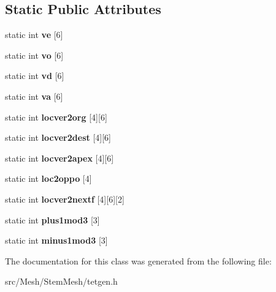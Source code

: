 \subsection*{Static Public Attributes}
\begin{DoxyCompactItemize}
\item 
\mbox{\label{classStemMesh3D_1_1tetgenmesh_a418aa92bf7126962188836f0ba8831f0}} 
static int {\bfseries ve} \mbox{[}6\mbox{]}
\item 
\mbox{\label{classStemMesh3D_1_1tetgenmesh_aaaf6941b2175d20b725c5cc29c256ee2}} 
static int {\bfseries vo} \mbox{[}6\mbox{]}
\item 
\mbox{\label{classStemMesh3D_1_1tetgenmesh_a1dc3584acb1ffdda4ad0a2b1eedfbcb7}} 
static int {\bfseries vd} \mbox{[}6\mbox{]}
\item 
\mbox{\label{classStemMesh3D_1_1tetgenmesh_ac4887ef4540ee117e9c0daee542e9928}} 
static int {\bfseries va} \mbox{[}6\mbox{]}
\item 
\mbox{\label{classStemMesh3D_1_1tetgenmesh_ad993ff3250c17fc730ec35fcfdd1c968}} 
static int {\bfseries locver2org} \mbox{[}4\mbox{]}\mbox{[}6\mbox{]}
\item 
\mbox{\label{classStemMesh3D_1_1tetgenmesh_a3a960be38f4658125ab0e04b79f13b51}} 
static int {\bfseries locver2dest} \mbox{[}4\mbox{]}\mbox{[}6\mbox{]}
\item 
\mbox{\label{classStemMesh3D_1_1tetgenmesh_a13ef51c89589190b0057ecd389ea4281}} 
static int {\bfseries locver2apex} \mbox{[}4\mbox{]}\mbox{[}6\mbox{]}
\item 
\mbox{\label{classStemMesh3D_1_1tetgenmesh_a14e932a5488b6b7fa157c5e8bca853af}} 
static int {\bfseries loc2oppo} \mbox{[}4\mbox{]}
\item 
\mbox{\label{classStemMesh3D_1_1tetgenmesh_ab1cfbaa712cdd6c0d76b9e3c6da225d2}} 
static int {\bfseries locver2nextf} \mbox{[}4\mbox{]}\mbox{[}6\mbox{]}\mbox{[}2\mbox{]}
\item 
\mbox{\label{classStemMesh3D_1_1tetgenmesh_a82975a0939c1fa285326d9c7251a7bd3}} 
static int {\bfseries plus1mod3} \mbox{[}3\mbox{]}
\item 
\mbox{\label{classStemMesh3D_1_1tetgenmesh_a6068c82a1e0e2e9648a7ec525de2bdde}} 
static int {\bfseries minus1mod3} \mbox{[}3\mbox{]}
\end{DoxyCompactItemize}


The documentation for this class was generated from the following file\+:\begin{DoxyCompactItemize}
\item 
src/\+Mesh/\+Stem\+Mesh/tetgen.\+h\end{DoxyCompactItemize}
